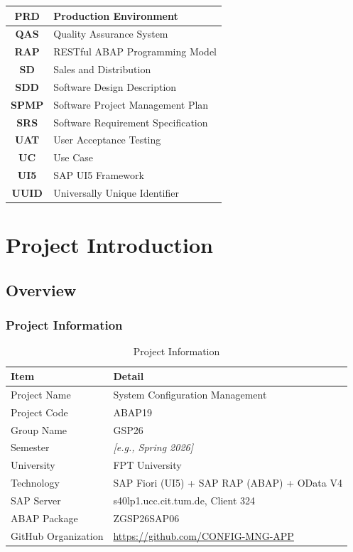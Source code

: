 \documentclass[12pt,a4paper]{report}
\newcommand{\placeholder}[1]{\textcolor{placeholderblue}{\textit{[#1]}}}
\begin{document}
\begin{longtable}{|c|p{10cm}|}
  \textbf{PRD}   & Production Environment \\ \hline
  \textbf{QAS}   & Quality Assurance System \\ \hline
  \textbf{RAP}   & RESTful ABAP Programming Model \\ \hline
  \textbf{SD}    & Sales and Distribution \\ \hline
  \textbf{SDD}   & Software Design Description \\ \hline
  \textbf{SPMP}  & Software Project Management Plan \\ \hline
  \textbf{SRS}   & Software Requirement Specification \\ \hline
  \textbf{UAT}   & User Acceptance Testing \\ \hline
  \textbf{UC}    & Use Case \\ \hline
  \textbf{UI5}   & SAP UI5 Framework \\ \hline
  \textbf{UUID}  & Universally Unique Identifier \\ \hline
\end{longtable}


\clearpage
\chapter{Project Introduction}

\section{Overview}

\subsection{Project Information}

\begin{table}[H]
\centering\small
\begin{tabularx}{\textwidth}{|l|X|}
  \hline
  \rowcolor{tableheadpeach}
  \textbf{Item} & \textbf{Detail} \\ \hline
  Project Name        & System Configuration Management \\ \hline
  Project Code        & ABAP19 \\ \hline
  Group Name          & GSP26 \\ \hline
  Semester            & \placeholder{e.g., Spring 2026} \\ \hline
  University          & FPT University \\ \hline
  Technology          & SAP Fiori (UI5) + SAP RAP (ABAP) + OData V4 \\ \hline
  SAP Server          & s40lp1.ucc.cit.tum.de, Client 324 \\ \hline
  ABAP Package        & ZGSP26SAP06 \\ \hline
  GitHub Organization & \url{https://github.com/CONFIG-MNG-APP} \\ \hline
\end{tabularx}
\caption{Project Information}
\label{tab:project-info}
\end{table}
\end{document}
